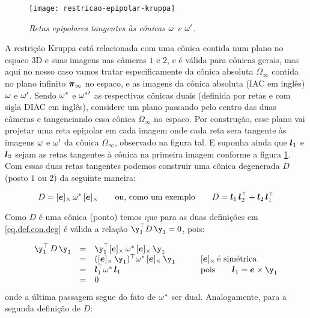 \begin{figure}[!htb]
\centering
\texttt{[image: restricao-epipolar-kruppa]}
\caption{\textit{Retas epipolares tangentes às cônicas ${\bf \omega}$ e ${\bf \omega'}$.}}
\label{epipolar-kruppa}
\end{figure}

A restrição Kruppa está relacionada com uma cônica contida num plano no espaco 3D e suas imagens nas câmeras $1$ e $2$, e é válida para cônicas gerais, mas aqui no nosso caso vamos tratar especificamente da cônica absoluta $\Omega_\infty$ contida no plano infinito $\boldsymbol{\pi}_\infty$ no espaco, e as imagens da cônica absoluta (IAC em inglês) ${\bf \omega}$ e ${\bf \omega'}$. Sendo ${\bf \omega}^*$ e ${{\bf \omega}^*}'$ as respectivas cônicas duais (definida por retas e com sigla DIAC em inglês), considere um plano passando pelo centro das duas câmeras e tangenciando essa cônica $\Omega_\infty$ no espaco. Por construção, esse plano vai projetar uma reta epipolar em cada imagem onde cada reta sera tangente às imagens ${\bf \omega}$ e ${\bf \omega'}$ da cônica $\Omega_\infty$, observado na figura tal. E suponha ainda que $\boldsymbol{l}_1$ e $\boldsymbol{l}_2$ sejam as retas tangentes à cônica na primeira imagem conforme a figura \ref{epipolar-kruppa}. Com essas duas retas tangentes podemos construir uma cônica degenerada $D$ (posto $1$ ou $2$) da seguinte maneira:  

\begin{equation}\label{eq.def.con.deg}
D=[\boldsymbol{e}]_\times\,{\bf \omega}^*\,[\boldsymbol{e}]_\times \qquad \text{ou, como um exemplo} \qquad D=\boldsymbol{l}_1\,\boldsymbol{l}_2^\top + \boldsymbol{l}_2\,\boldsymbol{l}_1^\top
\end{equation}

Como $D$ é uma cônica (ponto) temos que para as duas definições  em \ref{eq.def.con.deg} é válida a relação $\y_1^\top D\,\y_1=0$, pois:

\begin{equation*}
\begin{array}{rcll}
\y_1^\top\,D\,\y_1&=&\y_1^\top [\e]_\times\,{\bf \omega}^*\,[\e]_\times\,\y_1&\\
&=&([\e]_\times\,\y_1)^\top {\bf \omega}^*\,[\e]_\times\,\y_1& \qquad [\e]_\times\,\text{é simétrica}\\
&=&\lightrgb_1^\top {\bf \omega}^*\,\lightrgb_1& \qquad\text{pois}\qquad\lightrgb_1=\e\times\y_1\\
&=&0&
\end{array}
\end{equation*}
onde a última passagem segue do fato de ${\bf \omega}^*$ ser dual. Analogamente, para a segunda definição de $D$:

